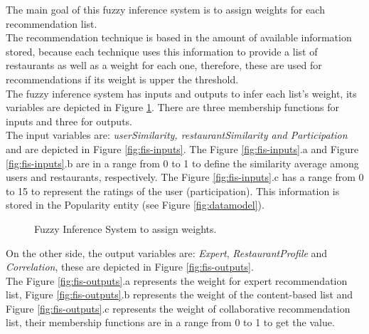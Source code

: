 The main goal of this fuzzy inference system is to assign weights for
each recommendation list.\\ The recommendation technique is based in the
amount of available information stored, because each technique uses
this information to provide a list of restaurants as well as a weight
for each one, therefore, these are used for  recommendations if its
weight is upper the threshold.  \\The fuzzy inference system has inputs
and outputs to infer each list's weight, its variables are depicted in
Figure  \ref{fig:fis-pesos}.  There are three membership functions for
inputs and three for outputs. \\The input variables are:
\textit{userSimilarity, restaurantSimilarity and Participation} and
are depicted in Figure  \ref{fig:fis-inputs}. The  Figure  \ref{fig:fis-inputs}.a
and  Figure  \ref{fig:fis-inputs}.b  are in a range from 0 to 1 to
define the similarity average among users and restaurants,
respectively. The Figure  \ref{fig:fis-inputs}.c has a range from 0
to 15  to represent the ratings of the user (participation). This
information is stored in the Popularity entity (see 
Figure  \ref{fig:datamodel}).
\begin{figure}
\captionsetup{justification=centering,margin=2cm,font=footnotesize}
\centering
{}
\caption{Fuzzy Inference System to assign weights.}
\label{fig:fis-pesos}       
\end{figure}
On the other side, the output variables are: 
\textit{Expert}, \textit{RestaurantProfile} and \textit{Correlation}, 
these are depicted in 
Figure  \ref{fig:fis-outputs}. \\The Figure  \ref{fig:fis-outputs}.a  represents
the weight for expert recommendation list, Figure  \ref{fig:fis-outputs}.b 
represents the weight of the content-based list and 
Figure  \ref{fig:fis-outputs}.c  represents the weight of collaborative
recommendation list, their membership functions are in a range from 0
to 1 to get the value.
